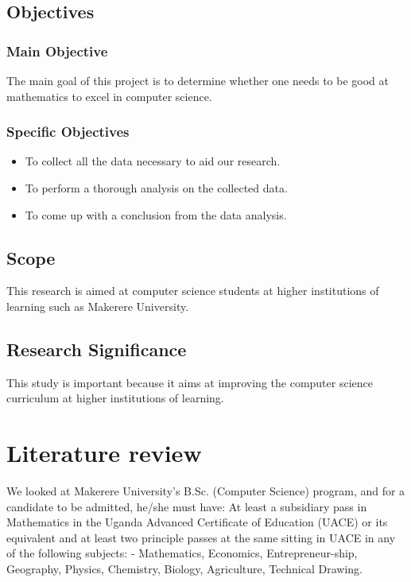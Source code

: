 \documentclass[options]{article}
\begin{document}
\subsection{\textbf{Objectives}}


\subsubsection{\textbf{Main Objective}} 
The main goal of this project is to determine whether one needs to be good at mathematics to excel in computer science. 


\subsubsection{\textbf{Specific Objectives}}

\begin{itemize}
  \item To collect all the data necessary to aid our research.
  \item To perform a thorough analysis on the collected data.
  \item To come up with a conclusion from the data analysis.
\end{itemize}


\subsection{\textbf{Scope}}
This research is aimed at computer science students at higher institutions of learning such as Makerere University.

\subsection{\textbf{Research Significance}}
This study is important because it aims at improving the computer science curriculum at higher institutions of learning.



\section{\textbf{Literature review}}

We looked at \cite{latexGuide}Makerere University's B.Sc. (Computer Science) program, and for a candidate to be admitted, he/she must have: At least a subsidiary pass in Mathematics in the Uganda Advanced Certificate of Education (UACE) or its equivalent and at least two principle passes at the same sitting in UACE in any of the following subjects: - Mathematics, Economics, Entrepreneur-ship, Geography, Physics, Chemistry, Biology, Agriculture, Technical Drawing.
\end{document}
